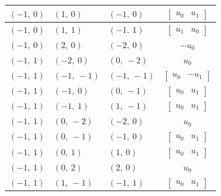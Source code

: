 \documentclass[11pt]{article}
\theoremstyle{definition}
\begin{document}
\begin{longtable}{|l|l|l|c|}
    \hline
    $\left( -1, \  0\right)$ & $\left( 1, \  0\right)$ & $\left( -1, \  0\right)$ & $\left[\begin{matrix}u_{0} & u_{1}\end{matrix}\right]$ \\
    \hline
    $\left( -1, \  0\right)$ & $\left( 1, \  1\right)$ & $\left( -1, \  1\right)$ & $\left[\begin{matrix}u_{1} & u_{0}\end{matrix}\right]$ \\
    \hline
    $\left( -1, \  0\right)$ & $\left( 2, \  0\right)$ & $\left( -2, \  0\right)$ & $- u_{0}$ \\
    \hline
    $\left( -1, \  1\right)$ & $\left( -2, \  0\right)$ & $\left( 0, \  -2\right)$ & $u_{0}$ \\
    \hline
    $\left( -1, \  1\right)$ & $\left( -1, \  -1\right)$ & $\left( -1, \  -1\right)$ & $\left[\begin{matrix}u_{0} & - u_{1}\end{matrix}\right]$ \\
    \hline
    $\left( -1, \  1\right)$ & $\left( -1, \  0\right)$ & $\left( 0, \  -1\right)$ & $\left[\begin{matrix}u_{0} & u_{1}\end{matrix}\right]$ \\
    \hline
    $\left( -1, \  1\right)$ & $\left( -1, \  1\right)$ & $\left( 1, \  -1\right)$ & $\left[\begin{matrix}u_{0} & u_{1}\end{matrix}\right]$ \\
    \hline
    $\left( -1, \  1\right)$ & $\left( 0, \  -2\right)$ & $\left( -2, \  0\right)$ & $u_{0}$ \\
    \hline
    $\left( -1, \  1\right)$ & $\left( 0, \  -1\right)$ & $\left( -1, \  0\right)$ & $\left[\begin{matrix}u_{0} & u_{1}\end{matrix}\right]$ \\
    \hline
    $\left( -1, \  1\right)$ & $\left( 0, \  1\right)$ & $\left( 1, \  0\right)$ & $\left[\begin{matrix}u_{0} & u_{1}\end{matrix}\right]$ \\
    \hline
    $\left( -1, \  1\right)$ & $\left( 0, \  2\right)$ & $\left( 2, \  0\right)$ & $u_{0}$ \\
    \hline
    $\left( -1, \  1\right)$ & $\left( 1, \  -1\right)$ & $\left( -1, \  1\right)$ & $\left[\begin{matrix}u_{0} & u_{1}\end{matrix}\right]$ \\

\end{longtable}
\end{document}
